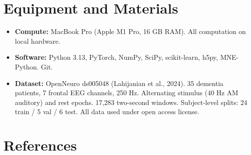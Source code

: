 \documentclass[11pt,letterpaper]{article}
\begin{document}
\section*{Equipment and Materials}

\begin{itemize}[noitemsep]
  \item \textbf{Compute:} MacBook Pro (Apple M1 Pro, 16 GB RAM). All computation on local
        hardware.
  \item \textbf{Software:} Python 3.13, PyTorch, NumPy, SciPy, scikit-learn, h5py,
        MNE-Python. Git.
  \item \textbf{Dataset:} OpenNeuro ds005048 (Lahijanian et al., 2024). 35 dementia patients,
        7 frontal EEG channels, 250 Hz. Alternating stimulus (40 Hz AM auditory) and rest
        epochs. 17,283 two-second windows. Subject-level splits: 24 train / 5 val / 6 test.
        All data used under open access license.
\end{itemize}

\section*{References}
\end{document}
